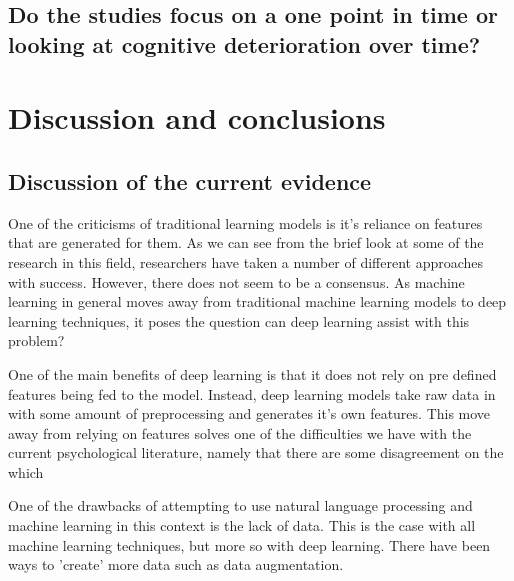 \subsection{Do the studies focus on a one point in time or looking at cognitive deterioration over time?}

\section{Discussion and conclusions}\label{discussion}
\subsection{Discussion of the current evidence}
One of the criticisms of traditional learning models is it's reliance on features that are generated for them. As we can see from the brief look at some of the research in this field, researchers have taken a number of different approaches with success. However, there does not seem to be a consensus. As machine learning in general moves away from traditional machine learning models to deep learning techniques, it poses the question can deep learning assist with this problem?
\par 
One of the main benefits of deep learning is that it does not rely on pre defined features being fed to the model. Instead, deep learning models take raw data in with some amount of preprocessing and generates it's own features. This move away from relying on features solves one of the difficulties we have with the current psychological literature, namely that there are some disagreement on the which 
\par 
One of the drawbacks of attempting to use natural language processing and machine learning in this context is the lack of data. This is the case with all machine learning techniques, but more so with deep learning. There have been ways to 'create' more data such as data augmentation. 


